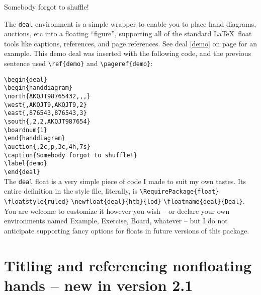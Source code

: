 \documentclass[10pt]{article}%
\begin{document}
\begin{deal}
\begin{handdiagram}
\end{handdiagram}
\caption{Somebody forgot to shuffle!}
\label{demo}
\end{deal}


The \verb+deal+ environment is a simple wrapper to enable you to place hand diagrams, auctions, etc into a floating ``figure'', supporting all of the standard \LaTeX\ float tools like captions, references, and page references. See deal \ref{demo} on page \pageref{demo}  for an example. This demo deal was inserted with the following code, and the previous sentence used \verb+\ref{demo}+ and \verb+\pageref{demo}+:

\noindent\verb+\begin{deal}+\\
\verb+\begin{handdiagram}+\\
\verb+\north{AKQJT98765432,,,}+\\
\verb+\west{,AKQJT9,AKQJT9,2}+\\
\verb+\east{,876543,876543,3}+\\
\verb+\south{,2,2,AKQJT987654}+\\
\verb+\boardnum{1}+\\
\verb+\end{handdiagram}+\\
\verb+\auction{,2c,p,3c,4h,7s}+\\
\verb+\caption{Somebody forgot to shuffle!}+\\
\verb+\label{demo}+\\
\verb+\end{deal}+\\

The \verb+deal+ float is a very simple piece of code I made to suit my own tastes. Its entire definition in the style file, literally, is \verb+\RequirePackage{float}+
\verb+\floatstyle{ruled}+
\verb+\newfloat{deal}{htb}{lod}+ 
\verb+\floatname{deal}{Deal}+. You are welcome to customize it however you wish -- or declare your own environments named Example, Exercise, Board, whatever -- but I do not anticipate supporting fancy options for floats in future versions of this package.

\section{Titling and referencing nonfloating hands -- new in version 2.1}
\end{document}
